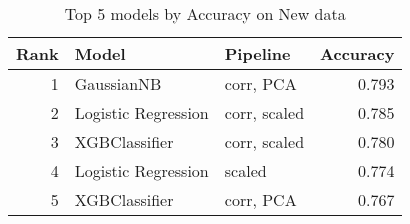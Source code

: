 \begin{table}[!htb]
\caption{Top 5 models by Accuracy on New data}
\label{table-top-5-accuracy-new}
\centering
\begin{tabular}{rllr}
\toprule
Rank & Model & Pipeline & Accuracy \\
\midrule
1 & GaussianNB & corr, PCA & 0.793 \\
2 & Logistic Regression & corr, scaled & 0.785 \\
3 & XGBClassifier & corr, scaled & 0.780 \\
4 & Logistic Regression & scaled & 0.774 \\
5 & XGBClassifier & corr, PCA & 0.767 \\
\bottomrule
\end{tabular}
\end{table}
